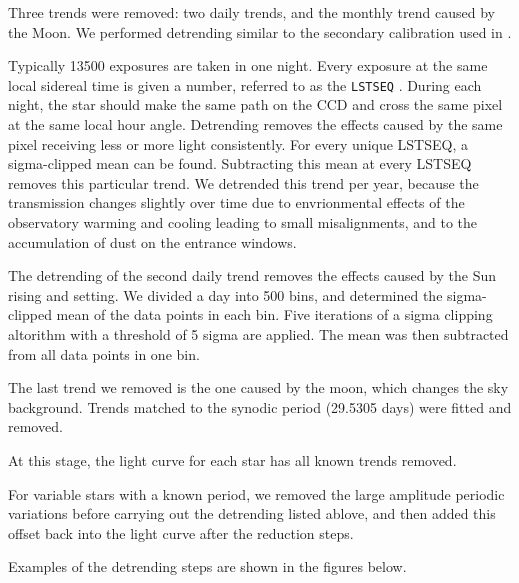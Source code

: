 \documentclass{aa}
\begin{document}
Three trends were removed: two daily trends, and the monthly trend caused by the Moon.
%
We performed detrending similar to the secondary calibration used in \cite{Talens_2018}.

Typically 13500 exposures are taken in one night.
%
Every exposure at the same local sidereal time is given a number, referred to as the {\tt LSTSEQ} \citep{Talens_2018}.
%
During each night, the star should make the same path on the CCD and cross the same pixel at the same local hour angle.
%
Detrending removes the effects caused by the same pixel receiving less or more light consistently.
%
For every unique LSTSEQ, a sigma-clipped mean can be found.
%
Subtracting this mean at every LSTSEQ removes this particular trend.
%
We detrended this trend per year, because the transmission changes slightly over time due to envrionmental effects of the observatory warming and cooling leading to small misalignments, and to the accumulation of dust on the entrance windows.


The detrending of the second daily trend removes the effects caused by the Sun rising and setting.
%
We divided a day into 500 bins, and determined the sigma-clipped mean of the data points in each bin.
%
Five iterations of a sigma clipping altorithm with a threshold of 5 sigma are applied.
%
%
The mean was then subtracted from all data points in one bin.

The last trend we removed is the one caused by the moon, which changes the sky background.
%
Trends matched to the synodic period (29.5305 days) were fitted and removed.
%


At this stage, the light curve for each star has all known trends removed.

For variable stars with a known period, we removed the large amplitude periodic variations before carrying out the detrending listed ablove, and then added this offset back into the light curve after the reduction steps.

Examples of the detrending steps are shown in the figures below.
\end{document}
